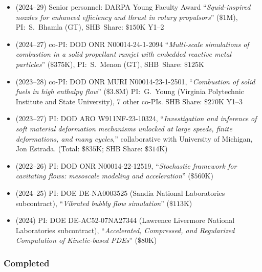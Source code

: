 \begin{itemize}
    \item (2024--29) Senior personnel: DARPA Young Faculty Award ``\textit{Squid-inspired nozzles for enhanced  efficiency and thrust in rotary propulsors}'' ($\$1$M), PI:~S.~Bhamla (GT), SHB~Share: $\$150$K Y1--2
    \item (2024--27) co-PI: DOD ONR N00014-24-1-2094 ``\textit{Multi-scale simulations of combustion in a solid propellant ramjet with embedded reactive metal particles}'' ($\$375$K), PI:~S.~Menon (GT), SHB~Share: $\$125$K 
    \item (2023--28) co-PI: DOD ONR MURI N00014-23-1-2501, ``\textit{Combustion of solid fuels in high enthalpy flow}'' ($\$3.8$M) PI:~G.~Young (Virginia Polytechnic Institute and State University), 7 other co-PIs. SHB Share: $\$270$K Y1--3
    \item (2023--27) PI: DOD ARO W911NF-23-10324, ``\textit{Investigation and inference of soft material deformation mechanisms unlocked at large speeds, finite deformations, and many cycles},'' collaborative with University of Michigan, Jon Estrada. (Total: $\$835$K; SHB Share: $\$314$K)
    \item (2022--26) PI: DOD ONR N00014-22-12519, ``\textit{Stochastic framework for cavitating flows: mesoscale modeling and acceleration}'' ($\$560$K)
    \item (2024--25) PI: DOE DE-NA0003525 (Sandia National Laboratories subcontract), ``\textit{Vibrated bubbly flow simulation}'' ($\$113$K)
    \item (2024) PI: DOE DE-AC52-07NA27344 (Lawrence Livermore National Laboratories subcontract), ``\textit{Accelerated, Compressed, and Regularized Computation of Kinetic-based PDEs}'' ($\$80$K)
\end{itemize}

\subsubsection{Completed}

